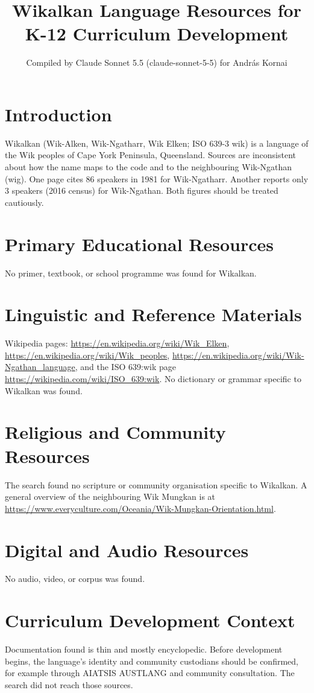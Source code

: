 \documentclass[12pt]{article}
\title{Wikalkan Language Resources for K-12 Curriculum Development}
\author{Compiled by Claude Sonnet 5.5 (claude-sonnet-5-5) for Andr\'as Kornai}
\date{}
\begin{document}
\maketitle

\section{Introduction}
Wikalkan (Wik-Alken, Wik-Ngatharr, Wik Elken; ISO 639-3 wik) is a language of the Wik peoples of Cape York Peninsula, Queensland. Sources are inconsistent about how the name maps to the code and to the neighbouring Wik-Ngathan (wig). One page cites 86 speakers in 1981 for Wik-Ngatharr. Another reports only 3 speakers (2016 census) for Wik-Ngathan. Both figures should be treated cautiously.

\section{Primary Educational Resources}
No primer, textbook, or school programme was found for Wikalkan.

\section{Linguistic and Reference Materials}
Wikipedia pages: \url{https://en.wikipedia.org/wiki/Wik_Elken}, \url{https://en.wikipedia.org/wiki/Wik_peoples}, \url{https://en.wikipedia.org/wiki/Wik-Ngathan_language}, and the ISO 639:wik page \url{https://wikipedia.com/wiki/ISO_639:wik}. No dictionary or grammar specific to Wikalkan was found.

\section{Religious and Community Resources}
The search found no scripture or community organisation specific to Wikalkan. A general overview of the neighbouring Wik Mungkan is at \url{https://www.everyculture.com/Oceania/Wik-Mungkan-Orientation.html}.

\section{Digital and Audio Resources}
No audio, video, or corpus was found.

\section{Curriculum Development Context}
Documentation found is thin and mostly encyclopedic. Before development begins, the language's identity and community custodians should be confirmed, for example through AIATSIS AUSTLANG and community consultation. The search did not reach those sources.
\end{document}
